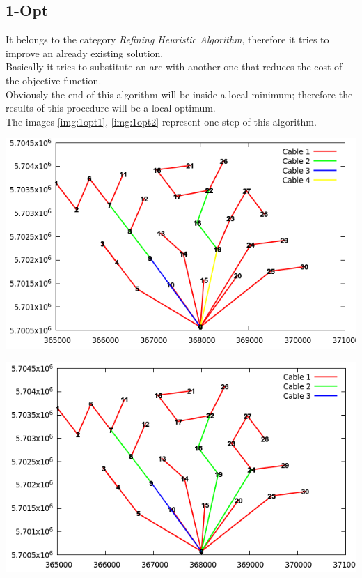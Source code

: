 \subsection{1-Opt} \label{subsec:1opt}
It belongs to the category \textit{Refining Heuristic Algorithm}, therefore it tries to improve an already existing solution.\\                                                         
Basically it tries to substitute an arc with another one that reduces the cost of the objective function. \\
Obviously the end of this algorithm will be inside a local minimum; therefore the results of this procedure will be a local optimum. \\
The images \ref{img:1opt1}, \ref{img:1opt2} represent one step of this algorithm. \\

\begin{minipage}{7cm} 
	\centering
	\includegraphics[scale=0.3]{Graphics/1opt-1.png} \\
	\label{img:1opt1}
	\end{minipage}
	\begin{minipage}{7cm} 
	\centering
	\includegraphics[scale=0.3]{Graphics/1opt-2.png} \\
	\label{img:1opt2}
	\end{minipage}

